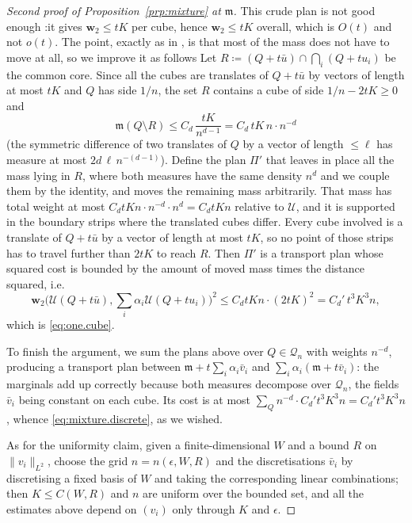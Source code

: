\documentclass[11pt,reqno]{amsart}
\theoremstyle{plain}
\theoremstyle{definition}
\newcommand{\dw}{\mathbf{w}_2}
\newcommand{\Leb}{\mathfrak{m}}
\begin{document}
\begin{proof}[Second proof of Proposition~\ref{prp:mixture} at \( \Leb \)]
    This crude plan is not good enough :it gives \( \dw\le tK \) per cube, hence \( \dw\le tK \) overall, which is \( O(t) \) and not \( o(t) \).
    The point, exactly as in \cite[Figure 2]{kloeckner_optimal_2013_preprint}, is that most of the mass does not have to move at all, so we improve it as follows
    Let \( R\coloneqq (Q+t\bar u)\cap\bigcap_i(Q+tu_i) \) be the common core.
    Since all the cubes are translates of \(Q+t\bar u\) by vectors of length at most \(tK\) and \( Q \) has side \( 1/n \), the set \( R \) contains a cube of side \( 1/n-2tK\ge0 \) and
    \[
        \Leb(Q\setminus R)\le C_d\,\frac{tK}{n^{d-1}}=C_d\,tK\,n\cdot n^{-d}
    \]
    (the symmetric difference of two translates of \( Q \) by a vector of length \( \le\ell \) has measure at most \( 2d\,\ell\,n^{-(d-1)} \)).
    Define the plan \( \Pi' \) that leaves in place all the mass lying in \( R \), where both measures have the same density \( n^{d} \) and we couple them by the identity, and moves the remaining mass arbitrarily.
    That mass has total weight at most \( C_dtKn\cdot n^{-d}\cdot n^{d}=C_dtKn \) relative to \( \mathcal U \), and it is supported in the boundary strips where the translated cubes differ.
    Every cube involved is a translate of \( Q+t\bar u \) by a vector of length at most \( tK \), so no point of those strips has to travel further than \( 2tK \) to reach \( R \).
    Then \( \Pi' \) is a transport plan whose squared cost is bounded by the amount of moved mass times the distance squared, i.e.
    \[
        \dw\Big(\mathcal U(Q+t\bar u),\sum_i\alpha_i\mathcal U(Q+tu_i)\Big)^2
        \le C_dtKn\cdot(2tK)^2
        =C_d'\,t^3K^3n,
    \]
    which is \eqref{eq:one.cube}.

    To finish the argument, we sum the plans above over \( Q\in\mathcal Q_n \) with weights \( n^{-d} \), producing a transport plan between \( \Leb+t\sum_i\alpha_i\bar v_i \) and \( \sum_i\alpha_i(\Leb+t\bar v_i) \): the marginals add up correctly because both measures decompose over \( \mathcal Q_n \), the fields \( \bar v_i \) being constant on each cube.
    Its cost is at most \( \sum_{Q}n^{-d}\cdot C_d't^3K^3n=C_d't^3K^3n \), whence \eqref{eq:mixture.discrete}, as we wished.

    As for the uniformity claim, given a finite-dimensional \( W \) and a bound \( R \) on \( \lVert v_i \rVert_{L^2} \), choose the grid \( n=n(\epsilon,W,R) \) and the discretisations \( \bar v_i \) by discretising a fixed basis of \( W \) and taking the corresponding linear combinations; then \( K\le C(W,R) \) and \( n \) are uniform over the bounded set, and all the estimates above depend on \( (v_i) \) only through \( K \) and \( \epsilon \).
\end{proof}
\end{document}
